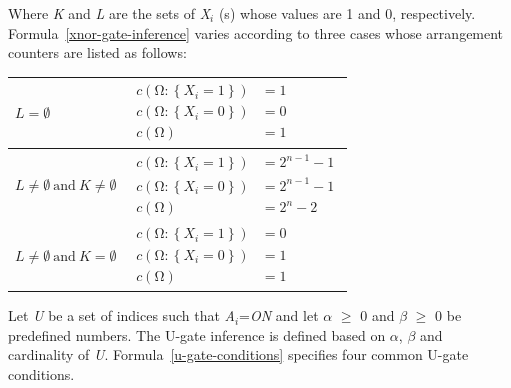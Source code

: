 \documentclass{article}
\numberwithin{equation}{section}
\numberwithin{figure}{section}
\numberwithin{table}{section}
\begin{document}
Where \textit{K} and \textit{L} are the sets of \textit{X${}_{i}$} (s) whose values are 1 and 0, respectively. Formula~\ref{xnor-gate-inference} varies according to three cases whose arrangement counters are listed as follows:
\begin{center}
\begin{tabular}{l|l}
$L=\emptyset$ &
  $\begin{aligned}
  c\left(\mathrm{\Omega }:\left\{X_i=1\right\}\right)&=1\\
  c\left(\mathrm{\Omega }:\left\{X_i=0\right\}\right)&=0\\
  c\left(\mathrm{\Omega }\right)&=1
  \end{aligned}$\\
\hline
$L\neq \emptyset \ \mathrm{and}\ K\neq \emptyset$ &
  $\begin{aligned}
  c\left(\mathrm{\Omega }:\left\{X_i=1\right\}\right)&=2^{n-1}-1\\
  c\left(\mathrm{\Omega }:\left\{X_i=0\right\}\right)&=2^{n-1}-1\\
  c\left(\mathrm{\Omega }\right)&=2^n-2
  \end{aligned}$\\
\hline
$L\neq \emptyset \ \mathrm{and}\ K=\emptyset$ &
  $\begin{aligned}
  c\left(\mathrm{\Omega }:\left\{X_i=1\right\}\right)&=0\\
  c\left(\mathrm{\Omega }:\left\{X_i=0\right\}\right)&=1\\
  c\left(\mathrm{\Omega }\right)&=1
  \end{aligned}$\\
\end{tabular}
\end{center}
Let \textit{U} be a set of indices such that \textit{A${}_{i}$}=\textit{ON} and let \textit{$\alpha$} $\mathrm{\ge}$ 0 and \textit{$\beta$} $\mathrm{\ge}$ 0 be predefined numbers. The U-gate inference is defined based on \textit{$\alpha$}, \textit{$\beta$} and cardinality of \textit{U}. Formula~\ref{u-gate-conditions} specifies four common U-gate conditions.
\end{document}
